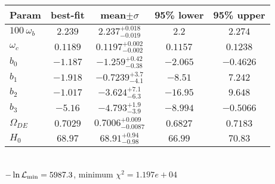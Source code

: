 \begin{tabular}{|l|c|c|c|c|} 
 \hline 
Param & best-fit & mean$\pm\sigma$ & 95\% lower & 95\% upper \\ \hline 
$100~\omega_{b }$ &$2.239$ & $2.237_{-0.019}^{+0.018}$ & $2.2$ & $2.274$ \\ 
$\omega_c$ &$0.1189$ & $0.1197_{-0.002}^{+0.002}$ & $0.1157$ & $0.1238$ \\ 
$b_{0 }$ &$-1.187$ & $-1.259_{-0.38}^{+0.42}$ & $-2.065$ & $-0.4626$ \\ 
$b_{1 }$ &$-1.918$ & $-0.7239_{-4.1}^{+3.7}$ & $-8.51$ & $7.242$ \\ 
$b_{2 }$ &$-1.017$ & $-3.624_{-6.3}^{+7.1}$ & $-16.95$ & $9.648$ \\ 
$b_{3 }$ &$-5.16$ & $-4.793_{-3.9}^{+1.9}$ & $-8.994$ & $-0.5066$ \\ 
$\Omega_{DE}$ &$0.7029$ & $0.7006_{-0.0087}^{+0.009}$ & $0.6827$ & $0.7183$ \\ 
$H_{0 }$ &$68.97$ & $68.91_{-0.98}^{+0.94}$ & $66.99$ & $70.83$ \\ 
\hline 
 \end{tabular} \\ 
$-\ln{\cal L}_\mathrm{min} =5987.3$, minimum $\chi^2=1.197e+04$ \\ 

